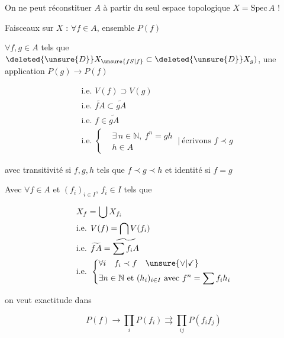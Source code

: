 On ne peut réconstituer $A$ à partir du seul espace topologique $X=\mathrm{Spec}\,A$ !

Faisceaux sur $X$ : $\forall f\in A$, ensemble $P(f)$

$\forall f,g\in A$ tels que $\deleted{\unsure{D}}X_{\unsure{fS|f}}\subset \deleted{\unsure{D}}X_g)$, une application $P(g)\to P(f)$

\[
\begin{aligned}
&\text{i.e. }V(f)\supset V(g)\\
&\text{i.e. }\widetilde{fA}\subset\widetilde{gA}\\
&\text{i.e. }f\in\widetilde{gA}\\
&\text{i.e. }\left\{\begin{aligned}&\exists\,n\in\mathbb N,\ f^n=gh\\&h\in A\end{aligned}\right.\ \big|\ \text{écrivons } f\prec g
\end{aligned}
\]

avec transitivité si $f,g,h$ tels que $f\prec g\prec h$ et identité si $f=g$

Avec $\forall f\in A$ et $(f_i)_{i\in I}$, $f_i\in{I}$ tels que

\[
\begin{aligned}
&X_f=\bigcup X_{f_i}\\
&\text{i.e. }V(f)=\bigcap V(f_i)\\
&\text{i.e. }\widetilde{fA}=\widetilde{\sum f_i A}\\
&\text{i.e. }\left\{\begin{aligned}
&\forall i\quad f_i\prec f\quad\unsure{\vee|\checkmark}\\
&\exists n\in\mathbb N\text{ et }(h_i)_{i\in I}\text{ avec } f^n=\sum f_i h_i
\end{aligned}\right.
\end{aligned}
\]

on veut exactitude dans

\[
P(f)\longrightarrow\prod_i P(f_i)\rightrightarrows\prod_{ij}P(f_i f_j)
\]

